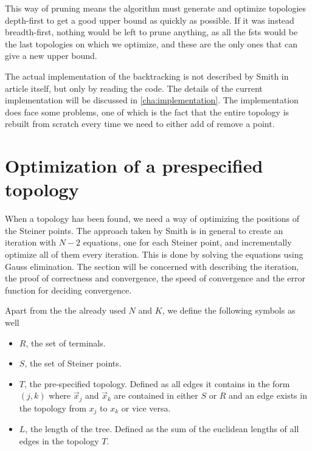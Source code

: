 This way of pruning means the algorithm must generate and optimize topologies
depth-first to get a good upper bound as quickly as possible.  If it was instead
breadth-first, nothing would  be left to prune anything, as all the \glspl{fst}
would be the last topologies on which we optimize, and these are the only ones
that can give a new upper bound.

The actual implementation of the backtracking is not described by Smith in
article itself, but only by reading the code.  The details of the current
implementation will be discussed in \cref{cha:implementation}.  The
implementation does face some problems, one of which is the fact that the entire
topology is rebuilt from scratch every time we need to either add of remove a
point.

\section{Optimization of a prespecified topology}
\label{sec:optim-presp-topol}

When a topology has been found, we need a way of optimizing the positions of the
Steiner points.  The approach taken by Smith is in general to create an
iteration with $N-2$ equations, one for each Steiner point, and incrementally
optimize all of them every iteration.  This is done by solving the equations
using Gauss elimination.  The section will be concerned with describing the
iteration, the proof of correctness and convergence, the speed of convergence
and the error function for deciding convergence.

Apart from the the already used $N$ and $K$, we define the following symbols as
well
%
\begin{itemize}
\item $R$, the set of terminals.
\item $S$, the set of Steiner points.
\item $T$, the pre-specified topology.  Defined as all edges it contains in the
form $(j,k)$ where $\vec x_j$ and $\vec x_k$ are contained in either $S$ or $R$
and an edge exists in the topology from $x_j$ to $x_k$ or vice versa.
\item $L$, the length of the tree.  Defined as the sum of the euclidean lengths
of all edges in the topology $T$.
\end{itemize}



